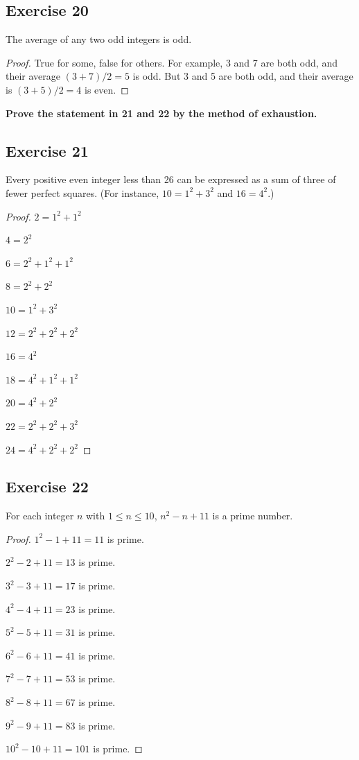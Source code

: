 \documentclass[14pt]{extarticle}
\newcommand{\cy}{\color{cyan}}
\begin{document}
\subsection{Exercise 20}
The average of any two odd integers is odd.

\begin{proof}
True for some, false for others. For example, 3 and 7 are both odd, and their average $(3+7)/2 = 5$ is odd. But 3 and 5 are both odd, and their average is $(3 + 5) / 2 = 4$ is even.
\end{proof}

{\bf \cy Prove the statement in 21 and 22 by the method of exhaustion.}

\subsection{Exercise 21}
Every positive even integer less than 26 can be expressed as a sum of three of fewer perfect squares. (For instance, $10 = 1^2 + 3^2$ and $16 = 4^2$.)

\begin{proof}
$2 = 1^2 + 1^2$

$4 = 2^2$

$6 = 2^2 + 1^2 + 1^2$

$8 = 2^2 + 2^2$

$10 = 1^2 + 3^2$

$12 = 2^2 + 2^2 + 2^2$

$16 = 4^2$

$18 = 4^2 + 1^2 + 1^2$

$20 = 4^2 + 2^2$

$22 = 2^2 + 2^2 + 3^2$

$24 = 4^2 + 2^2 + 2^2$
\end{proof}

\subsection{Exercise 22}
For each integer $n$ with $1 \leq n \leq 10$, $n^2 - n + 11$ is a prime number.

\begin{proof}
$1^2 - 1 + 11 = 11$ is prime.

$2^2 - 2 + 11 = 13$ is prime.

$3^2 - 3 + 11 = 17$ is prime.

$4^2 - 4 + 11 = 23$ is prime.

$5^2 - 5 + 11 = 31$ is prime.

$6^2 - 6 + 11 = 41$ is prime.

$7^2 - 7 + 11 = 53$ is prime.

$8^2 - 8 + 11 = 67$ is prime.

$9^2 - 9 + 11 = 83$ is prime.

$10^2 - 10 + 11 = 101$ is prime.
\end{proof}
\end{document}
